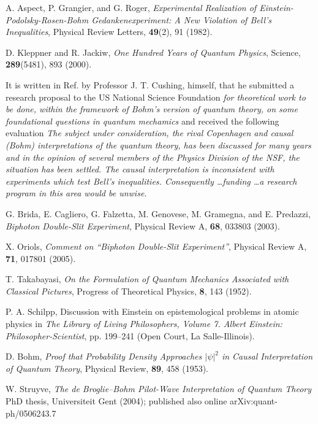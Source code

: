\documentclass[onecolumn,nofootinbib, secnumarabic, amsmath, nobibnotes,11pt,aps,pra]{revtex4-1}
\begin{document}
\begin{thebibliography}{999}
A. Aspect, P. Grangier, and G. Roger, \emph{Experimental Realization of Einstein-Podolsky-Rosen-Bohm Gedankenexperiment: A New Violation of Bell's Inequalities}, Physical Review Letters, \textbf{49}(2),  91 (1982).

D. Kleppner and R. Jackiw, \emph{One Hundred Years of Quantum Physics}, Science, \textbf{289}(5481),  893 (2000).

It is written in Ref. \cite{om.appraisal} by Professor J. T. Cushing, himself, that he submitted a research proposal to the US National Science Foundation \textit{for theoretical work to be done, within the framework of Bohm's version of quantum theory, on some foundational questions in quantum mechamics} and received the following evaluation \textit{The subject under consideration, the rival Copenhagen and causal (Bohm) interpretations of the quantum theory, has been discussed for many years and in the opinion of several members of the Physics Division of the NSF, the situation has been settled. The causal interpretation is inconsistent with experiments which test Bell's inequalities. Consequently \ldots funding \ldots a research program in this area would be unwise.}

G. Brida, E. Cagliero, G. Falzetta, M. Genovese, M. Gramegna, and E. Predazzi, \emph{Biphoton Double-Slit Experiment}, Physical Review A, \textbf{68},  033803 (2003).

X. Oriols, \emph{Comment on ``Biphoton Double-Slit Experiment''}, Physical Review A, \textbf{71},  017801 (2005).

T. Takabayasi, \emph{On the Formulation of Quantum Mechanics Associated with Classical Pictures}, Progress of Theoretical Physics, \textbf{8},  143 (1952).

P. A. Schilpp, Discussion with Einstein on epistemological problems in atomic physics in \emph{The Library of Living Philosophers, Volume 7. Albert Einstein: Philosopher-Scientist}, pp. 199--241 (Open Court, La Salle-Illinois).

D. Bohm, \emph{Proof that Probability Density Approaches $|\psi|^2$ in Causal Interpretation of Quantum Theory}, Physical Review, \textbf{89},  458 (1953).

W. Struyve, \emph{The de Broglie--Bohm Pilot-Wave Interpretation of Quantum Theory} PhD thesis, Universiteit Gent (2004); published also online arXiv:quant-ph/0506243.7


\end{thebibliography}
\end{document}

